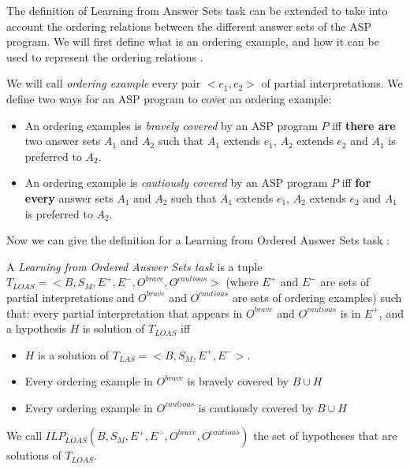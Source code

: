 The definition of Learning from Answer Sets task can be extended to take into account the ordering relations between the different answer sets of the ASP program. We will first define what is an ordering example, and how it can be used to represent the ordering relations \citep{law2015weak}.

\begin{definition}

We will call \textit{ordering example} every pair $<e_1,e_2>$ of partial interpretations. We define two ways for an ASP program to cover an ordering example:
\begin{itemize}
\item An ordering examples is \textit{bravely covered} by an ASP program $P$ iff \textbf{there are} two answer sets $A_1$ and $A_2$ such that $A_1$ extends $e_1$, $A_2$ extends $e_2$ and $A_1$ is preferred to $A_2$.
\item An ordering example is \textit{cautiously covered} by an ASP program $P$ iff \textbf{for every} answer sets $A_1$ and $A_2$ such that $A_1$ extends $e_1$, $A_2$ extends $e_2$ and $A_1$ is preferred to $A_2$.
\end{itemize}
\end{definition}

Now we can give the definition for a Learning from Ordered Answer Sets task \citep{law2015weak}:

\begin{definition}
A \textit{Learning from Ordered Answer Sets task} is a tuple $T_{LOAS}=<B, S_M, E^+, E^-,O^{brave}, O^{cautious}>$ (where $E^+$ and $E^-$ are sets of partial interpretations and $O^{brave}$ and $O^{cautious}$ are sets of ordering examples) such that: every partial interpretation that appears in $O^{brave}$ and $O^{cautious}$ is in $E^+$, and a hypothesis $H$ is solution of $T_{LOAS}$ iff 
\begin{itemize}
\item $H$ is a solution of $T_{LAS}=<B, S_M, E^+, E^->$.
\item Every ordering example in $O^{brave}$ is bravely covered by $B\cup H$
\item Every ordering example in $O^{cautious}$ is cautiously covered by $B\cup H$
\end{itemize}

We call $ILP_{LOAS}(B,S_M,E^+,E^-,O^{brave},O^{cautious})$ the set of hypotheses that are solutions of $T_{LOAS}$.
\end{definition}

\begin{example}

\end{example}

